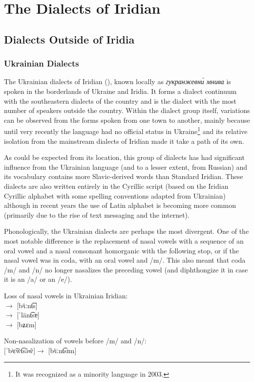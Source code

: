 \chapter{The Dialects of Iridian}\label{ch:dialects}


\section{Dialects Outside of Iridia}

\subsection{Ukrainian Dialects}

The Ukrainian dialects of Iridian (), known locally as \textit{\cyrtext гукран\-же\-вн\'и мни\-ва} is spoken in the borderlands of Ukraine and Iridia. It forms a dialect continuum with the southeastern dialects of the country and is the dialect with the most number of speakers outside the country. Within the dialect group itself, variations can be observed from the forms spoken from one town to another, mainly because until very recently the language had no official status in Ukraine\footnote{It was recognized as a minority language in 2003.} and its relative isolation from the mainstream dialects of Iridian made it take a path of its own.

As could be expected from its location, this group of dialects has had significant influence from the Ukrainian language (and to a lesser extent, from Russian) and its vocabulary contains more Slavic-derived words than Standard Iridian. These dialects are also written entirely in the Cyrillic script (based on the Iridian Cyrillic alphabet with some spelling conventions adapted from Ukrainian) although in recent years the use of Latin alphabet is becoming more common (primarily due to the rise of text messaging and the internet).

Phonologically, the Ukrainian dialects are perhaps the most divergent. One of the most notable difference is the replacement of nasal vowels with a sequence of an oral vowel and a nasal consonant homorganic with the following stop, or if the nasal vowel was in coda, with an oral vowel and /m/. This also meant that coda /m/ and /n/ no longer nasalizes the preceding vowel (and diphthongize it in case it is an /a/ or an /e/).

\ex
Loss of nasal vowels in Ukrainian Iridian:\\
\quad$\rightarrow$\quad{} [bʲiːnt͡s]\\
\quad$\rightarrow$\quad{} [ˈlänt͡sɐ]\\
\quad$\rightarrow$\quad{} [bʑɛm]
\xe

\ex
Non-nasalization of vowels before /m/ and /n/:\\
[ˈbʲɛ̃w̃t͡sə̃w̃]\quad$\rightarrow$\quad{} [bʲiːnt͡sɪm]\\

\xe
